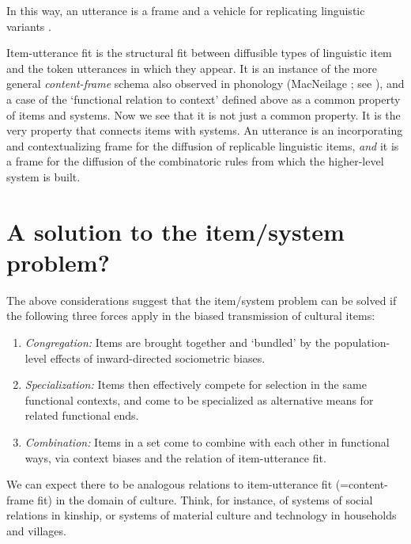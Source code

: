 In this way, an utterance is a frame and a vehicle for replicating linguistic variants \citep{croft_explaining_2000}. 



Item-utterance fit is the structural fit between diffusible types of 
linguistic item and the token utterances in which they appear. It is an 
instance of the more general \textit{content-frame} schema \citep{levelt_speaking:_1989} also 
observed in phonology (MacNeilage \citeyear{macneilage_frame/content_1998}; see \citealt[54--55]{enfield_relationship_2013}), and a 
case of the \textquoteleft functional relation to context' defined above as a common property of items and systems. Now we see that it is not just a 
common property. It is the very property that connects items with systems. An utterance is an incorporating and contextualizing 
frame for the diffusion of replicable linguistic items, \textit{and} it is a frame for the diffusion of the combinatoric rules from which the 
higher-level system is built. 



\section{A solution to the item/system problem?}


The above considerations suggest that the item/system problem can be 
solved if the following three forces apply in the 
biased transmission of cultural items: 

\begin{enumerate}

\item {\textit{Congregation:} Items are brought together and `bundled' by the population-level effects of inward-directed sociometric biases.}

\item {\textit{Specialization:} Items then effectively compete for selection in the same functional contexts, and come to be specialized as alternative means for related functional ends.}
 \item {\textit{Combination:} Items in a set come to combine with each other in functional ways, via context biases and the relation of item-utterance fit.} 

\end{enumerate}

We can expect there to be analogous relations to 
item-utterance fit  (=content-frame fit) in the domain of culture. Think, for instance, of 
systems of social relations in kinship, or systems of material culture 
and technology in households and villages. 



